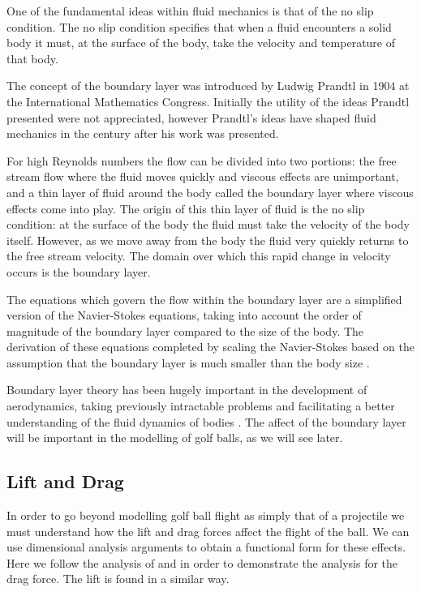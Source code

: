 One of the fundamental ideas within fluid mechanics is that of the no slip condition. The no slip 
condition specifies that when a fluid encounters a solid body it must, at the surface of the body,
take the velocity and temperature of that body. 

The concept of the boundary layer was introduced by Ludwig Prandtl in 1904 at the International
Mathematics Congress. Initially the utility of the ideas Prandtl presented were not appreciated, however
Prandtl's ideas have shaped fluid mechanics in the century after his work was presented.

For high Reynolds numbers the flow can be divided into two portions: the free stream flow where the
fluid moves quickly and viscous effects are unimportant, and a thin layer of fluid around the body 
called the boundary layer where viscous effects come into play. The origin of this thin layer of fluid
is the no slip condition: at the surface of the body the fluid must take the velocity of the body itself.
However, as we move away from the body the fluid very quickly returns to the free stream velocity. The
domain over which this rapid change in velocity occurs is the boundary layer.

The equations which govern the flow within the boundary layer are a simplified version of the
Navier-Stokes equations, taking into account the order of magnitude of the boundary layer compared to
the size of the body. The derivation of these equations completed by scaling the Navier-Stokes 
based on the assumption that the boundary layer is much smaller than the body size \citet{anderson}.

Boundary layer theory has been hugely important in the development of aerodynamics, taking previously
intractable problems and facilitating a better understanding of the fluid dynamics of bodies 
\citet{anderson}. The affect of the boundary layer will be important in the modelling of golf balls,
as we will see later.

\subsection{Lift and Drag} \label{sec:drag}

In order to go beyond modelling golf ball flight as simply that of a projectile we must understand 
how the lift and drag forces affect the flight of the ball. We can use dimensional analysis arguments
to obtain a functional form for these effects. Here we follow the analysis of 
\citet{0143-0807-31-4-019} and \citet{anderson} in order to demonstrate the analysis for the drag force. 
The lift is found in a similar way.

